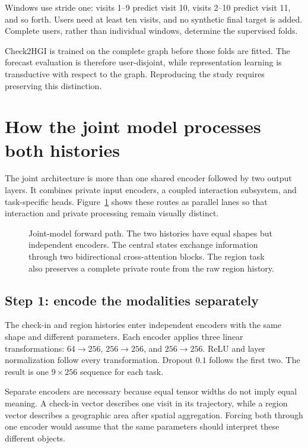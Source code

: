Windows use stride one: visits 1--9 predict visit 10, visits 2--10 predict visit
11, and so forth. Users need at least ten visits, and no synthetic final target is
added. Complete users, rather than individual windows, determine the supervised
folds.

Check2HGI is trained on the complete graph before those folds are fitted. The
forecast evaluation is therefore user-disjoint, while representation learning is
transductive with respect to the graph. Reproducing the study requires preserving
this distinction.

\section{How the joint model processes both histories}
\label{sec:apx-joint-forward}

The joint architecture is more than one shared encoder followed by two output
layers. It combines private input encoders, a coupled interaction subsystem, and
task-specific heads. Figure~\ref{fig:apx-joint-flow} shows these routes as parallel
lanes so that interaction and private processing remain visually distinct.

\begin{figure}[H]
    \centering
    
    \caption{Joint-model forward path. The two histories have equal shapes but
    independent encoders. The central states exchange information through two
    bidirectional cross-attention blocks. The region task also preserves a complete
    private route from the raw region history.}
    \label{fig:apx-joint-flow}
\end{figure}

\subsection{Step 1: encode the modalities separately}

The check-in and region histories enter independent encoders with the same shape
and different parameters. Each encoder applies three linear transformations:
$64\rightarrow256$, $256\rightarrow256$, and $256\rightarrow256$. ReLU and layer
normalization follow every transformation. Dropout $0.1$ follows the first two.
The result is one $9\times256$ sequence for each task.

Separate encoders are necessary because equal tensor widths do not imply equal
meaning. A check-in vector describes one visit in its trajectory, while a region
vector describes a geographic area after spatial aggregation. Forcing both through
one encoder would assume that the same parameters should interpret these different
objects.

